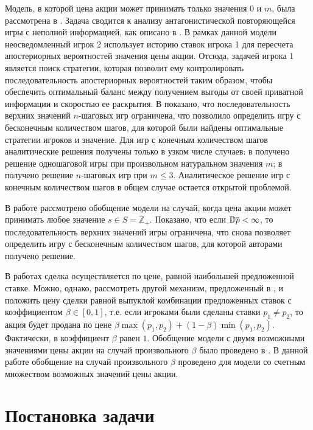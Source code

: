 \documentclass[12pt, draft]{extarticle}
\newcommand{\overbar}[1]%
{\mkern 1.5mu\overline{\mkern-1.3mu#1\mkern-1.3mu}\mkern 1.3mu}
\newcommand{\s}{\ensuremath{s}}
\newcommand{\p}{\ensuremath{\overbar{p}}}
\begin{document}
Модель, в которой цена акции может принимать только значения $0$ и $m$, была
рассмотрена в \cite{bib:domansky07}. Задача сводится к анализу антагонистической
повторяющейся игры с неполной информацией, как описано в \cite{bib:aumann}. В
рамках данной модели неосведомленный игрок 2 использует историю ставок игрока 1
для пересчета апостериорных вероятностей значения цены акции. Отсюда, задачей
игрока 1 является поиск стратегии, которая позволит ему контролировать
последовательность апостериорных вероятностей таким образом, чтобы обеспечить
оптимальный баланс между получением выгоды от своей приватной информации и
скоростью ее раскрытия. В \cite{bib:domansky07} показано, что последовательность
верхних значений $n$-шаговых игр ограничена, что позволило определить игру с
бесконечным количеством шагов, для которой были найдены оптимальные стратегии
игроков и значение.
%
Для игр с конечным количеством шагов аналитические решения получены только в
узком числе случаев: в \cite{bib:sandomirskaya12} получено решение одношаговой
игры при произвольном натуральном значения $m$; в \cite{bib:kreps09} получено
решение $n$-шаговых игр при $m \leqslant 3$. Аналитическое решение игр с
конечным количеством шагов в общем случае остается открытой проблемой.

В работе \cite{bib:domansky11} рассмотрено обобщение модели на случай, когда
цена акции может принимать любое значение $\s \in S = \mathbb{Z}_+$. Показано,
что если $\mathbb{D} \p < \infty$, то последовательность верхних значений игры
ограничена, что снова позволяет определить игру с бесконечным количеством шагов,
для которой авторами получено решение.

В работах \cite{bib:domansky07, bib:domansky11} сделка осуществляется по цене,
равной наибольшей предложенной ставке. Можно, однако, рассмотреть другой
механизм, предложенный в \cite{bib:chatterjee83}, и положить цену сделки равной
выпуклой комбинации предложенных ставок с коэффициентом $\beta \in [0,1]$, т.е.
если игроками были сделаны ставки $p_1 \neq p_2$, то акция будет продана по цене
$\beta \max(p_1, p_2) + (1-\beta) \min(p_1, p_2)$. Фактически, в
\cite{bib:domansky07, bib:domansky11} коэффициент $\beta$ равен $1$. Обобщение
модели с двумя возможными значениями цены акции на случай произвольного $\beta$
было проведено в \cite{bib:pyanykh16}. В данной работе обобщение на случай
произвольного $\beta$ проведено для модели со счетным множеством возможных
значений цены акции.

\section{Постановка задачи}
\label{sec:problem-statement}
\end{document}
